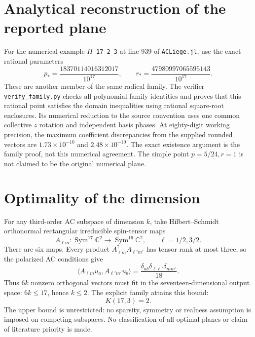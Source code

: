 \documentclass[11pt]{article}
\begin{document}
\section{Analytical reconstruction of the reported plane}
For the numerical example \texttt{\(\Pi\)\_17\_2\_3} at line 939 of
\texttt{ACLiege.jl}, use the exact rational parameters
\[
p_* =\frac{18370114016312017}{10^{17}},\qquad
r_* =\frac{47980997065595143}{10^{17}}.
\]
These are another member of the same radical family. The verifier
\texttt{verify\_family.py} checks all polynomial family identities and proves
that this rational point satisfies the domain inequalities using rational
square-root enclosures. Its numerical reduction to the source convention uses
one common collective $z$ rotation and independent basis phases. At eighty-digit
working precision, the maximum coefficient discrepancies from the supplied
rounded vectors are $1.73\times10^{-10}$ and $2.48\times10^{-10}$.
The exact existence argument is the family proof, not this numerical agreement.
The simple point $p=5/24,r=1$ is not claimed to be the original numerical plane.

\section{Optimality of the dimension}
For any third-order AC subspace of dimension $k$, take Hilbert--Schmidt
orthonormal rectangular irreducible spin-tensor maps
\[
A_{\ell m}:\operatorname{Sym}^{17}\mathbb C^2\to
\operatorname{Sym}^{16}\mathbb C^2,\qquad \ell=1/2,3/2.
\]
There are six maps. Every product $A_{\ell m}^\dagger A_{\ell'm'}$ has
tensor rank at most three, so the polarized AC conditions give
\[
\langle A_{\ell m}u_a,A_{\ell'm'}u_b\rangle
=\frac{\delta_{ab}\delta_{\ell\ell'}\delta_{mm'}}{18}.
\]
Thus $6k$ nonzero orthogonal vectors must fit in the seventeen-dimensional
output space: $6k\le17$, hence $k\le2$. The explicit family attains this bound:
\[
\boxed{K(17,3)=2.}
\]
The upper bound is unrestricted: no sparsity, symmetry or realness assumption
is imposed on competing subspaces. No classification of all optimal planes
or claim of literature priority is made.
\end{document}
